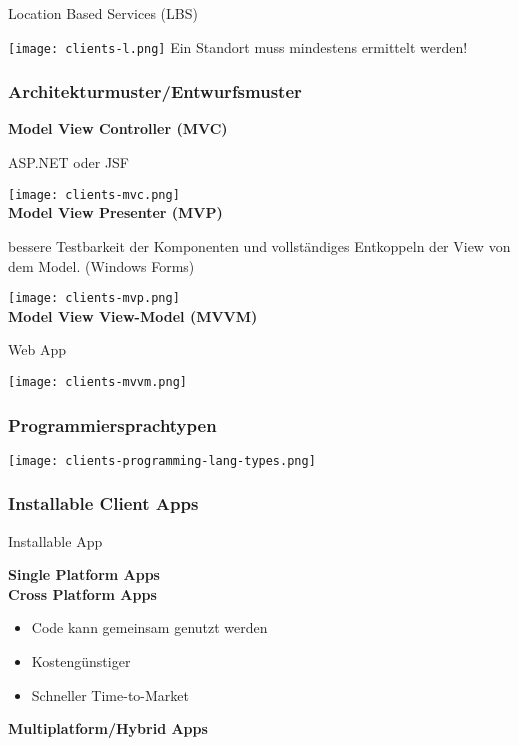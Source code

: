 Location Based Services (LBS)

\texttt{[image: clients-l.png]}
Ein Standort muss mindestens ermittelt werden!

\subsubsection{Architekturmuster/Entwurfsmuster}

\textbf{Model View Controller (MVC)}

ASP.NET oder JSF

\texttt{[image: clients-mvc.png]} \\


\textbf{Model View Presenter (MVP)}

bessere Testbarkeit der Komponenten und vollständiges Entkoppeln der View von dem Model. (Windows Forms)

\texttt{[image: clients-mvp.png]} \\

\textbf{Model View View-Model (MVVM)}

Web App

\texttt{[image: clients-mvvm.png]} \\

\subsubsection{Programmiersprachtypen}

\texttt{[image: clients-programming-lang-types.png]} \\

\subsubsection{Installable Client Apps}

Installable App

\textbf{Single Platform Apps} \\


\textbf{Cross Platform Apps}

\begin{itemize}
    \item Code kann gemeinsam genutzt werden
    \item Kostengünstiger
    \item Schneller Time-to-Market
\end{itemize}
\vspace{10pt}
\textbf{Multiplatform/Hybrid Apps}

